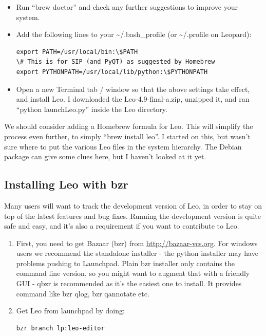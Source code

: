 \documentclass[a4paper,10pt,english]{sphinxmanual}
\begin{document}
\begin{itemize}
\item {} 
Run ``brew doctor'' and check any further suggestions to improve your system.

\item {} 
Add the following lines to your \textasciitilde{}/.bash\_profile (or \textasciitilde{}/.profile on Leopard):

\begin{Verbatim}[commandchars=\\\{\}]
export PATH=/usr/local/bin:\$PATH
\# This is for SIP (and PyQT) as suggested by Homebrew
export PYTHONPATH=/usr/local/lib/python:\$PYTHONPATH
\end{Verbatim}

\item {} 
Open a new Terminal tab / window so that the above settings take effect,
and install Leo. I downloaded the Leo-4.9-final-a.zip, unzipped it, and
ran ``python launchLeo.py'' inside the Leo directory.

\end{itemize}

We should consider adding a Homebrew formula for Leo. This will simplify
the process even further, to simply ``brew install leo''. I started on this,
but wasn't sure where to put the various Leo files in the system hierarchy.
The Debian package can give some clues here, but I haven't looked at it
yet.


\subsection{Installing Leo with bzr}
\label{installing:installing-leo-with-bzr}
Many users will want to track the development version of Leo, in order to stay
on top of the latest features and bug fixes. Running the development version is
quite safe and easy, and it's also a requirement if you want to contribute to
Leo.
\begin{enumerate}
\item {} 
First, you need to get Bazaar (bzr) from \href{http://bazaar-vcs.org}{http://bazaar-vcs.org}. For windows
users we recommend the standalone installer - the python installer may have
problems pushing to Launchpad. Plain bzr installer only contains the command
line version, so you might want to augment that with a friendly GUI - qbzr is
recommended as it's the easiest one to install. It provides command like
bzr qlog, bzr qannotate etc.

\item {} 
Get Leo from launchpad by doing:

\begin{Verbatim}[commandchars=\\\{\}]
bzr branch lp:leo-editor
\end{Verbatim}

\end{enumerate}
\end{document}
